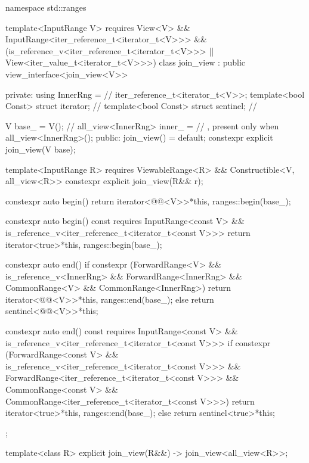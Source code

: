 \begin{codeblock}
namespace std::ranges {
  template<InputRange V>
    requires View<V> && InputRange<iter_reference_t<iterator_t<V>>> &&
             (is_reference_v<iter_reference_t<iterator_t<V>>> ||
              View<iter_value_t<iterator_t<V>>>)
  class join_view : public view_interface<join_view<V>> {
  private:
    using InnerRng =                    // \expos
      iter_reference_t<iterator_t<V>>;
    template<bool Const>
      struct iterator;                  // \expos
    template<bool Const>
      struct sentinel;                  // \expos

    V base_ = V();                      // \expos
    all_view<InnerRng> inner_ =         // \expos, present only when 
      all_view<InnerRng>();
  public:
    join_view() = default;
    constexpr explicit join_view(V base);

    template<InputRange R>
      requires ViewableRange<R> && Constructible<V, all_view<R>>
    constexpr explicit join_view(R&& r);

    constexpr auto begin() {
      return iterator<@@<V>>{*this, ranges::begin(base_)};
    }

    constexpr auto begin() const
    requires InputRange<const V> &&
             is_reference_v<iter_reference_t<iterator_t<const V>>> {
      return iterator<true>{*this, ranges::begin(base_)};
    }

    constexpr auto end() {
      if constexpr (ForwardRange<V> &&
                    is_reference_v<InnerRng> && ForwardRange<InnerRng> &&
                    CommonRange<V> && CommonRange<InnerRng>)
        return iterator<@@<V>>{*this, ranges::end(base_)};
      else
        return sentinel<@@<V>>{*this};
    }

    constexpr auto end() const
    requires InputRange<const V> &&
             is_reference_v<iter_reference_t<iterator_t<const V>>> {
      if constexpr (ForwardRange<const V> &&
                    is_reference_v<iter_reference_t<iterator_t<const V>>> &&
                    ForwardRange<iter_reference_t<iterator_t<const V>>> &&
                    CommonRange<const V> &&
                    CommonRange<iter_reference_t<iterator_t<const V>>>)
        return iterator<true>{*this, ranges::end(base_)};
      else
        return sentinel<true>{*this};
    }
  };

  template<class R>
    explicit join_view(R&&) -> join_view<all_view<R>>;
}
\end{codeblock}

